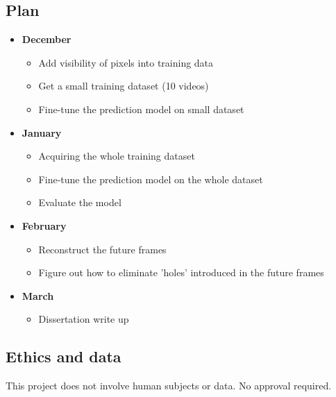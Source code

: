 \documentclass[11pt]{article}
\begin{document}
\subsection{Plan}\label{plan}
\begin{itemize}
\itemsep0em
    \item \textbf{December}
            \begin{itemize}
                \itemsep0em
                \item Add visibility of pixels into training data
                \item Get a small training dataset (10 videos)
                \item Fine-tune the prediction model on small dataset
            \end{itemize}
    \item \textbf{January}
            \begin{itemize}
                \itemsep0em
                \item Acquiring the whole training dataset
                \item Fine-tune the prediction model on the whole dataset
                \item Evaluate the model
            \end{itemize}
    \item \textbf{February}
            \begin{itemize}
              \itemsep0em
              \item Reconstruct the future frames
              \item Figure out how to eliminate 'holes' introduced in the future frames
            \end{itemize}
    \item \textbf{March}
            \begin{itemize}
                \itemsep0em
                \item Dissertation write up
            \end{itemize}
\end{itemize}

\subsection{Ethics and data}\label{ethics}
This project does not involve human subjects or data. No approval required.
\end{document}

